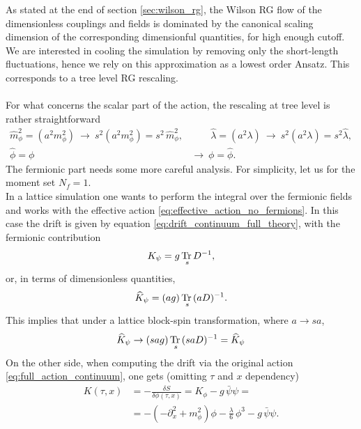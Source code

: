 As stated at the end of section \ref{sec:wilson_rg}, the Wilson RG flow of the dimensionless couplings and fields is dominated by the canonical scaling dimension of the corresponding dimensionful quantities, for high enough cutoff. 
We are interested in cooling the simulation by removing only the short-length fluctuations, hence we rely on this approximation as a lowest order Ansatz. This corresponds to a tree level RG rescaling. \\~\\
For what concerns the scalar part of the action, the rescaling at tree level is rather straightforward
\begin{equation*}
    \begin{aligned}
    \hat{m}_\phi^2 = (a^2m_\phi^2) \ \to \ s^2(a^2m_\phi^2) = s^2 \, \hat{m}_\phi^2, &\qquad \hat{\lambda} = (a^2\lambda) \ \to  \ s^2 (a^2\lambda) = s^2\hat{\lambda}, \\
    \hat\phi = \phi \ &\to \ \phi = \hat\phi.
    \end{aligned}
\end{equation*}
The fermionic part needs some more careful analysis. For simplicity, let us for the moment set $N_f = 1$. \\
In a lattice simulation one wants to perform the integral over the fermionic fields and works with the effective action \eqref{eq:effective_action_no_fermions}. In this case the drift is given by equation \eqref{eq:drift_continuum_full_theory}, with the fermionic contribution
\begin{equation}
    	K_{\psi} = g \, \underset{s}{\operatorname{\text{Tr} \,}}{D^{-1}},
	\label{eq:fermionic_drift_contribution}
\end{equation}
or, in terms of dimensionless quantities,
\begin{equation*}
    \widehat{K}_{\psi} = (ag) \, \underset{s}{\operatorname{\text{Tr} \,}}{(aD)^{-1}}.
\end{equation*}
This implies that under a lattice block-spin transformation, where $a \to sa$,
\begin{equation}
    \widehat{K}_{\psi} \to  (sag) \, \underset{s}{\operatorname{\text{Tr} \,}}{(saD)^{-1}} = \widehat{K}_{\psi}
    \label{eq:fermionic_rescaling_na\"ive}
\end{equation}
On the other side, when computing the drift via the original action \eqref{eq:full_action_continuum}, one gets (omitting $\tau$ and $x$ dependency)
\begin{equation}
    \begin{aligned}
        K(\tau, x) &= - \frac{\delta S}{\delta \phi(\tau, x)} = K_\phi - g \, \bar\psi\psi = \\
        &= -\left(-\partial^2_x + m_\phi^2\right) \phi - \frac{\lambda}{6} \, \phi^3 - g \, \bar\psi\psi.
    \end{aligned}
    \label{eq:drift_continuum_from_full_action}
\end{equation}
